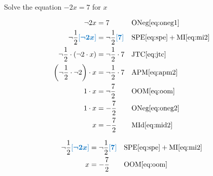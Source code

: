 \documentclass[20150903-160354-rs2.2-MarksMathNotebook.tex]{subfiles}
\begin{document}
\begin{example}[id:20141206-102723] \label{20141206-102723} \hfill \\

Solve the equation $-2x=7$ for $x$

\soln

\solnsteps
\begin{align*}
\neg 2x &= 7  && \text{ONeg} \eqref{eq:oneg1} \\
\neg \dfrac{1}{2}\farg{\neg 2x}  &= \neg \dfrac{1}{2}\farg{7} && \text{SPE} \eqref{eq:spe} + \text{MI} \eqref{eq:mi2} \\
\neg \dfrac{1}{2} \cdot \left( \neg 2 \cdot x \right) &= \neg \dfrac{1}{2} \cdot 7 && \text{JTC} \eqref{eq:jtc} \\
\left(\neg\dfrac{1}{2} \cdot \neg 2 \right) \cdot x &= \neg \dfrac{1}{2} \cdot 7  && \text{APM} \eqref{eq:apm2} \\
1\cdot x &= \neg \dfrac{7}{2}  && \text{OOM} \eqref{eq:oom} \\
1\cdot x &= -\dfrac{7}{2}  && \text{ONeg} \eqref{eq:oneg2} \\
x &= -\dfrac{7}{2}  && \text{MId} \eqref{eq:mid2}
\end{align*}

\soln

\lesssteps
\begin{align*}
\neg \dfrac{1}{2}\farg{\neg 2x}  &= \neg \dfrac{1}{2}\farg{7} && \text{SPE} \eqref{eq:spe} + \text{MI} \eqref{eq:mi2} \\
x &= -\dfrac{7}{2}  && \text{OOM} \eqref{eq:oom}
\end{align*}
\end{example}
\end{document}
